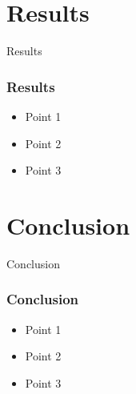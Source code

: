 \documentclass{beamer}
\begin{document}
\section{Results}
\begin{frame}{Results}
    \frametitle{Results}
    \begin{itemize}
        \item Point 1
        \item Point 2
        \item Point 3
    \end{itemize}
\end{frame}

\section{Conclusion}
\begin{frame}{Conclusion}
    \frametitle{Conclusion}
    \begin{itemize}
        \item Point 1
        \item Point 2
        \item Point 3
    \end{itemize}
\end{frame}

%     
%     
\end{document}
